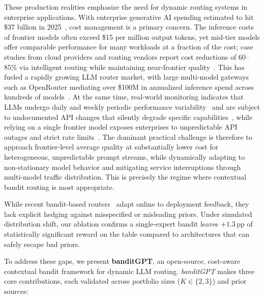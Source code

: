 These production realities emphasize the need for dynamic routing systems in enterprise applications. With enterprise generative AI spending estimated to hit \$37 billion in 2025~\cite{menlo2025genai}, cost management is a primary concern. The inference costs of frontier models often exceed \$15 per million output tokens, yet mid-tier models offer comparable performance for many workloads at a fraction of the cost; case studies from cloud providers and routing vendors report cost reductions of 60--85\% via intelligent routing while maintaining near-frontier quality~\cite{aws-multillm-routing-2025,swfte-intelligent-routing-2026}. This has fueled a rapidly growing LLM router market, with large multi-model gateways such as OpenRouter mediating over \$100M in annualized inference spend across hundreds of models~\cite{llm-router-market-2026,openrouter-growth-2025,openrouter-stats-2025,state-of-ai-openrouter-2025}. At the same time, real-world monitoring indicates that LLMs undergo daily and weekly periodic performance variability~\cite{johnson2026periodic} and are subject to undocumented API changes that silently degrade specific capabilities~\cite{chen2025silent}, while relying on a single frontier model exposes enterprises to unpredictable API outages and strict rate limits~\cite{reintech2025ratelimits}. The dominant practical challenge is therefore to approach frontier-level average quality at substantially lower cost for heterogeneous, unpredictable prompt streams, while dynamically adapting to non-stationary model behavior and mitigating service interruptions through multi-model traffic distribution. This is precisely the regime where contextual bandit routing is most appropriate.

While recent bandit-based routers~\cite{panda2025pilot, wang2025barp, li2025llmbandit} adapt online to deployment feedback, they lack explicit hedging against misspecified or misleading priors. Under simulated distribution shift, our ablation confirms a single-expert bandit leaves $+1.3$\,pp of statistically significant reward on the table compared to architectures that can safely escape bad priors.

To address these gaps, we present \textbf{banditGPT}, an open-source, cost-aware contextual bandit framework for dynamic LLM routing. \textit{banditGPT} makes three core contributions, each validated across portfolio sizes ($K{\in}\{2, 3\}$) and prior sources:

